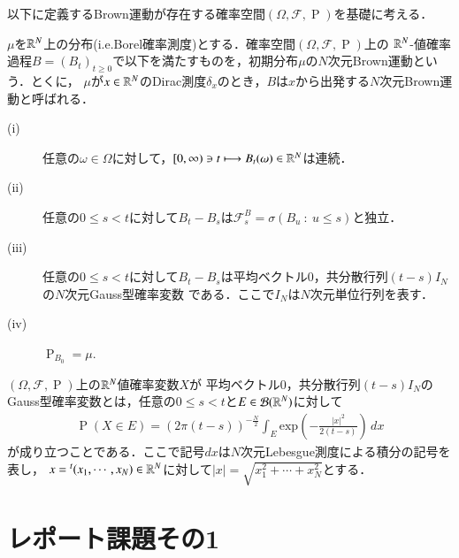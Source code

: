 
以下に定義するBrown運動が存在する確率空間$(\Omega, \mathcal{F}, \operatorname{P})$を基礎に考える．

\begin{dfn}
	$\mu$を$\mathbb{R}^N$上の分布(i.e.Borel確率測度)とする．確率空間$(\Omega, \mathcal{F}, \operatorname{P})$上の
	$\mathbb{R}^N$-値確率過程$B = (B_t)_{t \geq 0}$で以下を満たすものを，初期分布$\mu$の$N$次元Brown運動という．とくに，
	$\mu$が$x \in \mathbb{R}^N$のDirac測度$\delta_x$のとき，$B$は$x$から出発する$N$次元Brown運動と呼ばれる．
	\begin{description}
		\item[\rm{(i)}] 任意の$\omega \in \Omega$に対して，$[0,\infty) \ni t \longmapsto B_t(\omega) \in \mathbb{R}^N$は連続．
		\item[\rm{(ii)}] 任意の$0 \leq s < t$に対して$B_t - B_s$は$\mathcal{F}_s^B = \sigma(B_u\ :\ u \leq s)$と独立．
		\item[\rm{(iii)}] 任意の$0 \leq s < t$に対して$B_t - B_s$は平均ベクトル0，共分散行列$(t-s)I_N$の$N$次元Gauss型確率変数
			である．ここで$I_N$は$N$次元単位行列を表す．
		\item[\rm{(iv)}] $\operatorname{P}_{B_0} = \mu$.
	\end{description}
\end{dfn}

\begin{dfn}
	$(\Omega, \mathcal{F}, \operatorname{P})$上の$\mathbb{R}^N$値確率変数$X$が
	平均ベクトル0，共分散行列$(t-s)I_N$のGauss型確率変数とは，任意の$0 \leq s < t$と$E \in \mathcal{B}(\mathbb{R}^N)$に対して
	\begin{align}
		\operatorname{P}(X \in E) = (2\pi (t-s))^{-\frac{N}{2}} \int_{E} \mathrm{exp}\left( -\frac{|x|^2}{2(t-s)} \right)\, dx
	\end{align}
	が成り立つことである．ここで記号$dx$は$N$次元Lebesgue測度による積分の記号を表し，
	$x = {}^t(x_1,\cdots,x_N) \in \mathbb{R}^N$に対して$|x| = \sqrt{x_1^2 + \cdots + x_N^2}$とする．
\end{dfn}

\section{レポート課題その1}



